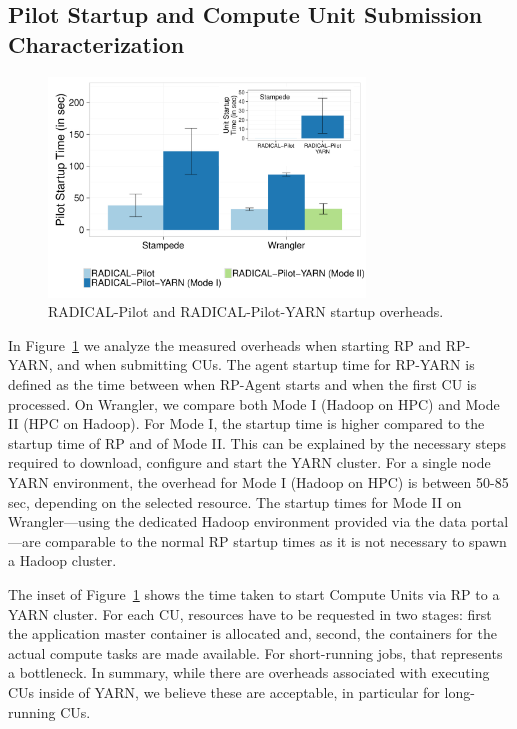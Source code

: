 \subsection{Pilot Startup and Compute Unit Submission Characterization}
\label{ssec:startup_pilot_unit}

\begin{figure}[t]
    \centering
    \includegraphics[width=0.75\textwidth]{figures/data_analytics_hpc/hpc_hadoop/pilot_unit_startup.pdf}
    \caption{RADICAL-Pilot and RADICAL-Pilot-YARN startup overheads.
        \label{fig:startup_yarn}}
\end{figure}

In Figure~\ref{fig:startup_yarn} we analyze the measured overheads when starting
RP and RP-YARN, and when submitting CUs. The
agent startup time for RP-YARN is defined as the time between when
RP-Agent starts and when the first CU is processed. On
Wrangler, we compare both Mode I (Hadoop on HPC) and Mode II (HPC on Hadoop).
For Mode I, the startup time is higher compared to the startup time of
RP and of Mode II. This can be explained by the necessary steps
required to download, configure and start the YARN cluster. For a single node
YARN environment, the overhead for Mode I (Hadoop on HPC) is between 50-85\,sec,
depending on the selected resource. The startup times for Mode II on
Wrangler---using the dedicated Hadoop environment provided via the data
portal---are comparable to the normal RP startup times as it is not
necessary to spawn a Hadoop cluster.

The inset of Figure~\ref{fig:startup_yarn} shows the time taken to start Compute
Units via RP to a YARN cluster. For each CU, resources have to be
requested in two stages: first the application master container is allocated
and, second, the containers for the actual compute tasks are made available. For
short-running jobs, that represents a bottleneck. In summary, while there are 
overheads associated with executing CUs inside of YARN, we believe 
these are acceptable, in particular for long-running CUs.

